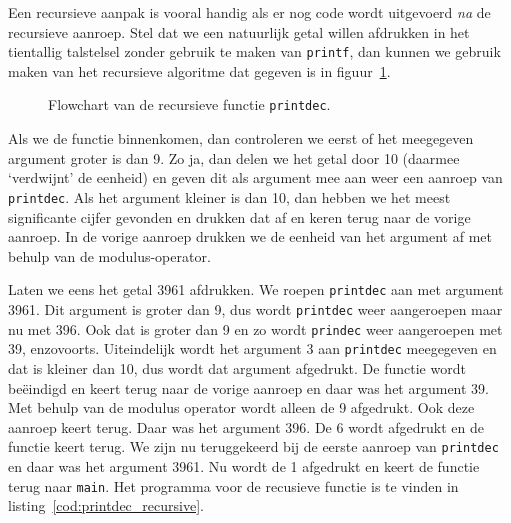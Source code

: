 Een recursieve aanpak is vooral handig als er nog code wordt uitgevoerd \emph{na} de recursieve aanroep.
Stel dat we een natuurlijk getal willen afdrukken in het tientallig talstelsel zonder gebruik te maken van \texttt{printf}, dan kunnen we gebruik maken van het recursieve algoritme dat gegeven is in figuur~\ref{fig:funprintdec}.

\begin{figure}[!ht]
\centering
{}
\caption{Flowchart van de recursieve functie \texttt{printdec}.}
\label{fig:funprintdec}
\end{figure}

Als we de functie binnenkomen, dan controleren we eerst of het meegegeven argument groter is dan 9. Zo ja, dan delen we het getal door 10 (daarmee `verdwijnt' de eenheid) en geven dit als argument mee aan weer een aanroep van \texttt{printdec}. Als het argument kleiner is dan 10, dan hebben we het meest significante cijfer gevonden en drukken dat af en keren terug naar de vorige aanroep. In de vorige aanroep drukken we de eenheid van het argument af met behulp van de modulus-operator.

Laten we eens het getal 3961 afdrukken. We roepen \texttt{printdec} aan met argument 3961. Dit argument is groter dan 9, dus wordt \texttt{printdec} weer aangeroepen maar nu met 396. Ook dat is groter dan 9 en zo wordt \texttt{prindec} weer aangeroepen met 39, enzovoorts. Uiteindelijk wordt het argument 3 aan \texttt{printdec} meegegeven en dat is kleiner dan 10, dus wordt dat argument afgedrukt. De functie wordt beëindigd en keert terug naar de vorige aanroep en daar was het argument 39. Met behulp van de modulus operator wordt alleen de 9 afgedrukt. Ook deze aanroep keert terug. Daar was het argument 396. De 6 wordt afgedrukt en de functie keert terug. We zijn nu teruggekeerd bij de eerste aanroep van \texttt{printdec} en daar was het argument 3961. Nu wordt de 1 afgedrukt en keert de functie terug naar \texttt{main}. Het programma voor de recusieve functie is te vinden in listing~\ref{cod:printdec_recursive}.

